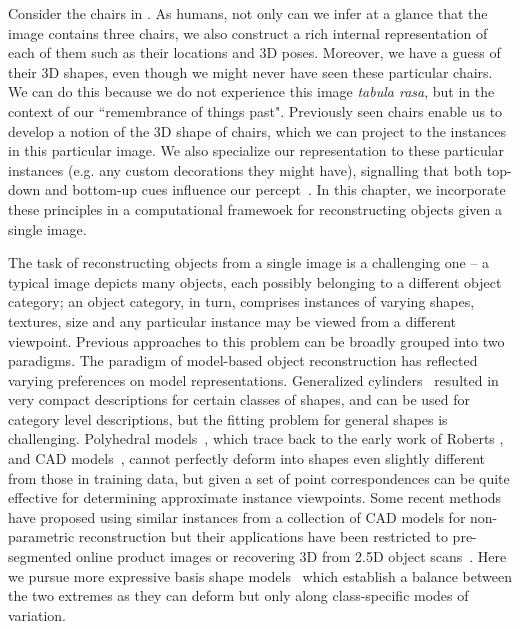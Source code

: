 Consider the chairs in . As humans, not only can we infer at a glance that the image contains three chairs, we also construct a rich internal representation of each of them such as their locations and 3D poses. Moreover, we have a guess of their 3D shapes, even though we might never have seen these particular chairs. We can do this because we do not experience this image {\em tabula rasa}, but in the context of our  ``remembrance of things past".   Previously seen chairs enable us to develop a notion of the 3D shape of chairs, which we can project to the instances in this particular image. We also specialize our representation to these particular instances (e.g. any custom decorations they might have), signalling that both top-down and bottom-up cues influence our percept~\cite{nandakumar2011little}. In this chapter, we incorporate these principles in a computational framewoek for reconstructing objects given a single image. 

The task of reconstructing objects from a single image is a challenging one -- a typical image depicts many objects, each possibly belonging to a different object category; an object category, in turn, comprises instances of varying shapes, textures, size \etc and any particular instance may be viewed from a different viewpoint. Previous approaches to this problem can be broadly grouped into two paradigms. The paradigm of model-based object reconstruction has reflected varying preferences on model representations.  Generalized cylinders~\cite{nevatia1977description} resulted in very compact descriptions for certain classes of shapes, and can be used for category level descriptions, but the fitting problem for general shapes is challenging. Polyhedral models~\cite{gupta2010blocks,xiao2012localizing}, which trace back to the early work of Roberts \cite{roberts1963machine}, and CAD models~\cite{limparsing,satkin20143dnn,Pepik_2015_CVPR_Workshops}, cannot perfectly deform into shapes even slightly different from those in training data, but given a set of point correspondences can be quite effective for determining approximate instance viewpoints. Some recent methods have proposed using similar instances from a collection of CAD models \cite{su2014estimating,huang2015single} for  non-parametric reconstruction but their applications have been restricted to pre-segmented online product images or recovering 3D from 2.5D object scans~\cite{sung2015data}. Here we pursue more expressive basis shape models~\cite{Anguelov:SCAPE2005,blanz1999morphable,zia2013detailed} which establish a balance between the two extremes as they can deform but only along class-specific modes of variation.

